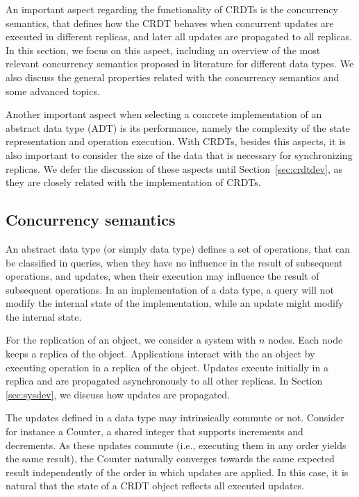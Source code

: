 \documentclass[11pt,a4paper]{article}
\begin{document}
An important aspect regarding the functionality of CRDTs is the 
concurrency semantics, that defines how the CRDT behaves when concurrent updates
are executed in different replicas, and later all updates are propagated 
to all replicas. 
In this section, we focus on this aspect, including an overview of the most 
relevant concurrency semantics proposed in literature for different data types.
We also discuss the general properties related with the concurrency semantics and
some advanced topics.

Another important aspect when selecting a concrete implementation of an abstract 
data type (ADT) is its performance, namely the complexity of the state representation and
operation execution. With CRDTs, besides this aspects, it is also important to 
consider the size of the data that is necessary for synchronizing replicas.
We defer the discussion of these aspects until Section~\ref{sec:crdtdev}, as
they are closely related with the implementation of CRDTs.



\subsection{Concurrency semantics}\label{sec:appdev:conc_sem}

An abstract data type (or simply data type) defines a set of operations,
that can be classified in queries, when they have no influence in the
result of subsequent operations, and updates, when their execution may 
influence the result of subsequent operations.
In an implementation of a data type, a query will not modify the internal state
of the implementation, while an update might modify the internal state.

For the replication of an object, we consider a system with $n$ nodes.
Each node keeps a replica of the object. Applications interact with the an object
by executing operation in a replica of the object. Updates execute initially in a
replica and are propagated asynchronously to all other replicas. 
In Section \ref{sec:sysdev}, we discuss how updates are propagated.

The updates defined in a data type may intrinsically commute or not. 
Consider for instance a Counter, a shared integer that supports increments 
and decrements. 
As these updates commute (i.e., executing them in any order yields the same result), 
the Counter naturally converges towards the same expected result
independently of the order in which updates are applied.
In this case, it is natural that the state of a CRDT object reflects all 
executed updates.
\end{document}
